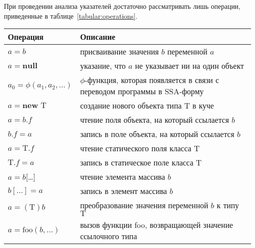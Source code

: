 \documentclass[14pt,titlepage]{extarticle}
\newcommand{\NEW}{\textbf{new }}
\newcommand{\NULL}{\textbf{null }}
\let\oldphi\phi
\renewcommand{\phi}{\ensuremath{\oldphi}}
\begin{document}
      При проведении анализа указателей достаточно рассматривать лишь
      операции, приведенные в таблице~\ref{tabular:operations}.

      \begin{table}
        \centering

        \begin{tabular}{|l|p{}|}\hline
          \textbf{Операция} & \textbf{Описание}\\ \hline

          $a = b$
          & присваивание значения $b$ переменной $a$ \\ \hline

          $a = \NULL$
          & указание, что $a$ не указывает ни на один объект \\ \hline

          $a_0 = \phi(a_1, a_2, \ldots)$
          & \phi-функция, которая появляется в связи с переводом программы в
            SSA-форму \\ \hline

          $a = \NEW \textrm{T}$
          & создание нового объекта типа $\textrm{T}$ в куче \\ \hline

          $a = b.f$
          & чтение поля объекта, на который ссылается $b$ \\ \hline

          $b.f = a$
          & запись в поле объекта, на который ссылается $b$ \\ \hline

          $a = \textrm{T}.f$
          & чтение статического поля класса $\textrm{T}$ \\ \hline

          $\textrm{T}.f = a$
          & запись в статическое поле класса $\textrm{T}$ \\ \hline

          $a = b$[\ldots]
          & чтение элемента массива $b$ \\ \hline

          $b[\ldots] = a$
          & запись в элемент массива $b$ \\ \hline

          $a = (\textrm{T})b$
          & преобразование значения переменной $b$ к типу $\textrm{T}$ \\ \hline

          $a = \textrm{foo}(b, \ldots)$
          & вызов функции foo, возвращающей значение ссылочного типа \\ \hline


\end{tabular}
\end{table}
\end{document}
